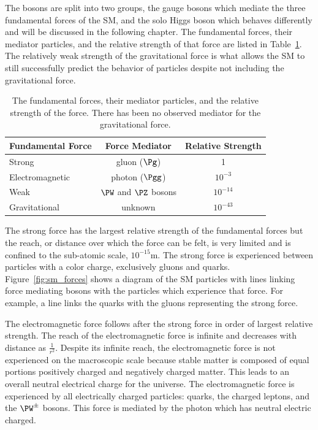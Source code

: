 The bosons are split into two groups, the gauge bosons which mediate the three fundamental
forces of the SM, and the solo Higgs boson which behaves differently
and will be discussed in the following chapter. 
The fundamental forces, their mediator particles, and the relative strength of that force
are listed in Table~\ref{tab:sm_forces}. The relatively weak strength of the gravitational
force is what allows the SM to still successfully predict the behavior
of particles despite not including the gravitational force.

\begin{table}[htbp]
\centering
\begin{tabular}{lcc}
Fundamental Force        &    Force Mediator             & Relative Strength   \\
\hline
Strong                   &    gluon ($\Pg$)              &   1                 \\ 
Electromagnetic          &    photon ($\Pgg$)            &   $10^{-3}$         \\ 
Weak                     &    $\PW$ and $\PZ$ bosons     &   $10^{-14}$        \\ 
Gravitational            &    unknown                    &   $10^{-43}$        \\ 
\hline
\end{tabular}
\caption{
The fundamental forces, their mediator particles, and the relative strength of the force.
There has been no observed mediator for the gravitational force.
}
\label{tab:sm_forces}
\end{table}

The strong force has the largest relative strength of the fundamental forces but
the reach, or distance over which the force can be felt, is very limited and is 
confined to the sub-atomic scale, $10^{-15}$m. The strong force is experienced
between particles with a color charge, exclusively gluons and quarks.
Figure~\ref{fig:sm_forces} shows a diagram of the SM particles with
lines linking force mediating bosons with the particles which experience that force.
For example, a line links the quarks with the gluons representing the
strong force.

The electromagnetic force follows after the strong force in order of largest relative
strength. The reach of the electromagnetic force is infinite and decreases with
distance as $\frac{1}{r^{2}}$. Despite its infinite reach, the electromagnetic 
force is not experienced on the macroscopic scale because stable matter is composed
of equal portions positively charged and negatively charged matter. This leads to
an overall neutral electrical charge for the universe. The electromagnetic force is experienced by all
electrically charged particles: quarks, the charged leptons, and the $\PW^{\pm}$ bosons.
This force is mediated by the photon which has neutral electric charged.

